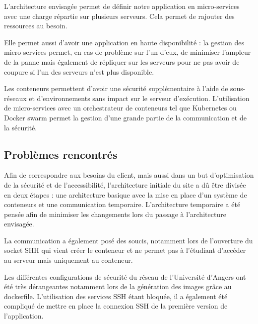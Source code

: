 \par L'architecture envisagée permet de définir notre application en micro-services avec une charge répartie sur plusieurs serveurs. Cela permet de rajouter des ressources au besoin. 
\par Elle permet aussi d’avoir une application en haute disponibilité : la gestion des micro-services permet, en cas de problème sur l’un d'eux, de minimiser l'ampleur de la panne mais également de répliquer sur les serveurs pour ne pas avoir de coupure si l’un des serveurs n’est plus disponible. 
\par Les conteneurs permettent d’avoir une sécurité supplémentaire à l’aide de sous-réseaux et d’environnements sans impact sur le serveur d’exécution. L’utilisation de micro-services avec un orchestrateur de \gls{conteneur}s tel que Kubernetes ou Docker swarm permet la gestion d'une grande partie de la communication et de la sécurité.   

\subsection{Problèmes rencontrés} 

\par Afin de correspondre aux besoins du client, mais aussi dans un but d'optimisation de la sécurité et de l'accessibilité, l’architecture initiale du site a dû être divisée en deux étapes : une architecture basique avec la mise en place d’un système de conteneurs et une communication temporaire. L’architecture temporaire a été pensée afin de minimiser les changements lors du passage à l’architecture envisagée. 
\par La communication a également posé des soucis, notamment lors de l’ouverture du socket SHH qui vient créer le conteneur et ne permet pas à l’étudiant d'accéder au serveur mais uniquement au conteneur.

\par Les différentes configurations de sécurité du réseau de l’Université d’Angers ont été très dérangeantes notamment lors de la génération des images grâce au \gls{dockerfile}. L’utilisation des services SSH étant bloquée, il a également été compliqué de mettre en place la connexion SSH de la première version de l’application. 